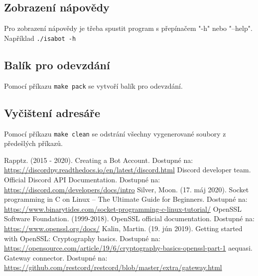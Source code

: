 \documentclass[a4paper,11pt]{article}
\begin{document}
\subsection{Zobrazení nápovědy}
Pro zobrazení nápovědy je třeba spustit program s přepínačem "-h" nebo "--help". Například \texttt{./isabot -h}

\subsection{Balík pro odevzdání}
Pomocí příkazu \texttt{make pack} se vytvoří balík pro odevzdání.

\subsection{Vyčištení adresáře}
Pomocí příkazu \texttt{make clean} se odstrání všechny vygenerované soubory z předešlých příkazů.

\newpage

\begin{thebibliography}{6}
	 Rapptz. (2015 - 2020). Creating a Bot Account. Dostupné na: \\ \url{https://discordpy.readthedocs.io/en/latest/discord.html}
	 Discord developer team. Official Discord API Documentation. Dostupné na: \\ \url{https://discord.com/developers/docs/intro}
	 Silver, Moon. (17. máj 2020). Socket programming in C on Linux – The Ultimate Guide for Beginners. Dostupné na: \\ \url{https://www.binarytides.com/socket-programming-c-linux-tutorial/}
	 OpenSSL Software Foundation. (1999-2018). OpenSSL official documentation. Dostupné na: \\ \url{https://www.openssl.org/docs/}
	 Kalin, Martin. (19. jún 2019). Getting started with OpenSSL: Cryptography basics. Dostupné na: \\ \url{https://opensource.com/article/19/6/cryptography-basics-openssl-part-1}
	 aequasi. Gateway connector. Dostupné na: \\ \url{https://github.com/restcord/restcord/blob/master/extra/gateway.html}
\end{thebibliography}
\end{document}
